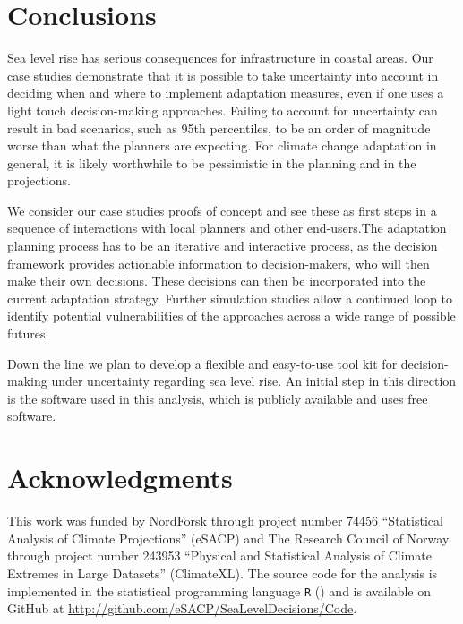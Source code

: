 \documentclass[note,screen,british,11pt]{nrdoc}
\begin{document}
\section{Conclusions}
\label{disc}
Sea level rise has serious consequences for infrastructure in coastal areas. Our case studies demonstrate that it is possible to take uncertainty into account in deciding when and where to implement adaptation measures, even if one uses a light touch decision-making approaches. Failing to account for uncertainty can result in bad scenarios, such as 95th percentiles, to be an order of magnitude worse than what the planners are expecting. For climate change adaptation in general, it is likely worthwhile to be pessimistic in the planning and in the projections. 

We consider our case studies proofs of concept and see these as first steps in a sequence of interactions with local planners and other end-users.The adaptation planning process has to be an iterative and interactive process, as the decision framework provides actionable information to decision-makers, who will then make their own decisions. These decisions can then be incorporated into the current adaptation strategy. Further simulation studies allow a continued loop to identify potential vulnerabilities of the approaches across a wide range of possible futures.

Down the line we plan to develop a flexible and easy-to-use tool kit for decision-making under uncertainty regarding sea level rise. An initial step in this direction is the software used in this analysis, which is publicly available and uses free software. 


\section*{Acknowledgments}
This work was funded by NordForsk through project number 74456 ``Statistical Analysis of Climate Projections'' (eSACP) and The Research Council of Norway through project number 243953 ``Physical and Statistical Analysis of Climate Extremes in Large Datasets'' (ClimateXL). The source code for the analysis is implemented in the statistical programming language {\tt R} (\citet{R}) and is available on GitHub at \url{http://github.com/eSACP/SeaLevelDecisions/Code}.








\end{document}
